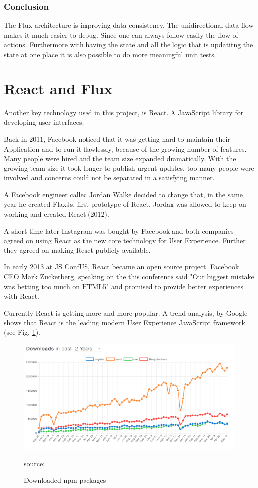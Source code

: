 \subsubsection{Conclusion}
The Flux architecture is improving data consistency. The unidirectional data flow makes it much easier to debug. Since one can always follow easily the flow of actions. Furthermore with having the state and all the logic that is updatitng the state at one place it is also possible to do more meaningful unit tests.

\section{React and Flux}

Another key technology used in this project, is React. A JavaScript library for developing user interfaces. \cite{React}

Back in 2011, Facebook noticed that it was getting hard to maintain their Application and to run it flawlessly, because of the growing number of features. Many people were hired and the team size expanded dramatically. With the growing team size it took longer to publish urgent updates, too many people were involved and concerns could not be separated in a satisfying manner.

A Facebook engineer called Jordan Walke decided to change that, in the same year he created FlaxJs, first prototype of React. Jordan was allowed to keep on working and created React (2012). 

A short time later Instagram was bought by Facebook and both companies agreed on using React as the new core technology for User Experience. Further they agreed on making React publicly available. 

In early 2013 at JS ConfUS, React became an open source project. Facebook CEO Mark Zuckerberg, speaking on the this conference said  "Our biggest mistake was betting too much on HTML5" and promised to provide better experiences with React.

Currently React is getting more and more popular. A trend analysis, by Google shows that React is the leading modern User Experience JavaScript framework (see Fig. \ref{fig:React}).

\begin{figure}[H]
	\centering
	\includegraphics[scale=0.4]{bilder/grundlagen/ReactDownloads.png}
	\caption{Downloaded npm packages} source: \cite{NPM}
	\label{fig:React}
\end{figure}

